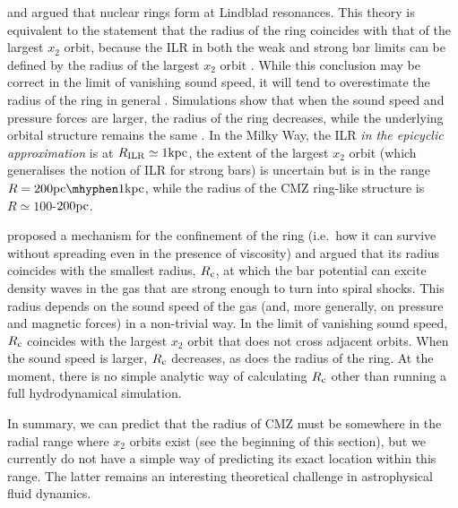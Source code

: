 \cite{Combes1988} and \cite{Buta1996} argued that nuclear rings form at Lindblad resonances. This theory is equivalent to the statement that the radius of the ring coincides with that of the largest $x_2$ orbit, because the ILR in both the weak and strong bar limits can be defined by the radius of the largest $x_2$ orbit \citep{VanAlbada1982}. While this conclusion may be correct in the limit of vanishing sound speed, it will tend to overestimate the radius of the ring in general \citep{Sormani2020c}. Simulations show that when the sound speed and pressure forces are larger, the radius of the ring decreases, while the underlying orbital structure remains the same \citep[e.g.][]{Englmaier1997,Patsis2000,Sormani2015c}. In the Milky Way, the ILR \emph{in the epicyclic approximation} is at $R_{\rm ILR}\simeq 1\mbox{${\rm kpc}$}$, the extent of the largest $x_2$ orbit (which generalises the notion of ILR for strong bars) is uncertain but is in the range $R=200\pc\mhyphen1\kpc$, while the radius of the CMZ ring-like structure is $R\simeq100$-$200\mbox{${\rm pc}$}$.

\cite{Sormani2018a} proposed a mechanism for the confinement of the ring (i.e.\ how it can survive without spreading even in the presence of viscosity) and argued that its radius coincides with the smallest radius, $R_{\rm c}$, at which the bar potential can excite density waves in the gas that are strong enough to turn into spiral shocks. This radius depends on the sound speed of the gas (and, more generally, on pressure and magnetic forces) in a non-trivial way. In the limit of vanishing sound speed, $R_{\rm c}$ coincides with the largest $x_2$ orbit that does not cross adjacent orbits. When the sound speed is larger, $R_{\rm c}$ decreases, as does the radius of the ring. At the moment, there is no simple analytic way of calculating $R_{\rm c}$ other than running a full hydrodynamical simulation.

In summary, we can predict that the radius of CMZ must be somewhere in the radial range where $x_2$ orbits exist (see the beginning of this section), but we currently do not have a simple way of predicting its exact location within this range. The latter remains an interesting theoretical challenge in astrophysical fluid dynamics.  


